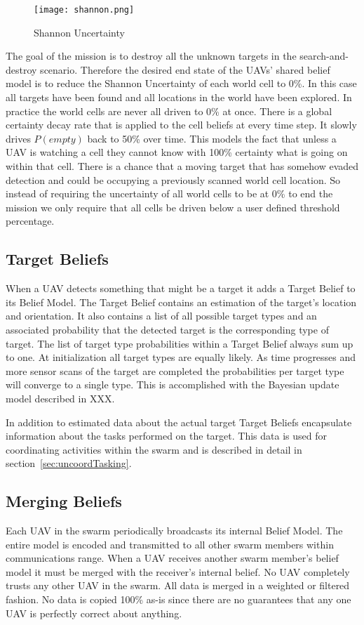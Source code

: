 \begin{figure}[p]
	\centering
	\texttt{[image: shannon.png]}
	\caption{Shannon Uncertainty}
	\label{fig:shannon}
\end{figure}

The goal of the mission is to destroy all the unknown targets in the search-and-destroy scenario.  Therefore the desired end state of the UAVs' shared belief model is to reduce the Shannon Uncertainty of each world cell to 0\%.  In this case all targets have been found and all locations in the world have been explored.  In practice the world cells are never all driven to 0\% at once.  There is a global certainty decay rate that is applied to the cell beliefs at every time step.  It slowly drives $P(empty)$ back to 50\% over time.  This models the fact that unless a UAV is watching a cell they cannot know with 100\% certainty what is going on within that cell.  There is a chance that a moving target that has somehow evaded detection and could be occupying a previously scanned world cell location.  So instead of requiring the uncertainty of all world cells to be at 0\% to end the mission we only require that all cells be driven below a user defined threshold percentage.

\subsection{Target Beliefs}
When a UAV detects something that might be a target it adds a Target Belief to its Belief Model.  The Target Belief contains an estimation of the target's location and orientation.  It also contains a list of all possible target types and an associated probability that the detected target is the corresponding type of target. The list of target type probabilities within a Target Belief always sum up to one.  At initialization all target types are equally likely.  As time progresses and more sensor scans of the target are completed the probabilities per target type will converge to a single type.  This is accomplished with the Bayesian update model described in XXX.  

In addition to estimated data about the actual target Target Beliefs encapsulate information about the tasks performed on the target.  This data is used for coordinating activities within the swarm and is described in detail in section~\ref{sec:uncoordTasking}.

\subsection{Merging Beliefs}
Each UAV in the swarm periodically broadcasts its internal Belief Model.  The entire model is encoded and transmitted to all other swarm members within communications range.  When a UAV receives another swarm member's belief model it must be merged with the receiver's internal belief.  No UAV completely trusts any other UAV in the swarm.  All data is merged in a weighted or filtered fashion.  No data is copied 100\% as-is since there are no guarantees that any one UAV is perfectly correct about anything.

